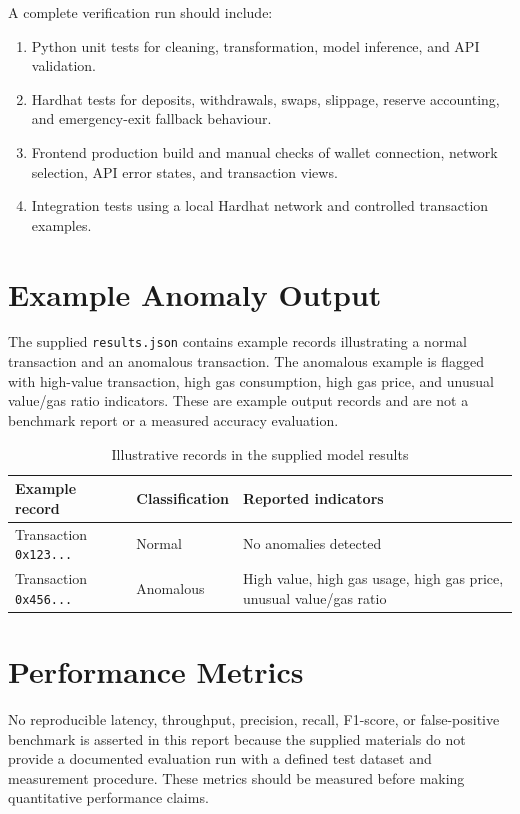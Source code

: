 \documentclass{tietreport}
\begin{document}
A complete verification run should include:
\begin{enumerate}
  \item Python unit tests for cleaning, transformation, model inference, and
  API validation.
  \item Hardhat tests for deposits, withdrawals, swaps, slippage, reserve
  accounting, and emergency-exit fallback behaviour.
  \item Frontend production build and manual checks of wallet connection,
  network selection, API error states, and transaction views.
  \item Integration tests using a local Hardhat network and controlled
  transaction examples.
\end{enumerate}

\section{Example Anomaly Output}
The supplied \texttt{results.json} contains example records illustrating a
normal transaction and an anomalous transaction. The anomalous example is
flagged with high-value transaction, high gas consumption, high gas price,
and unusual value/gas ratio indicators. These are example output records and
are not a benchmark report or a measured accuracy evaluation.

\begin{table}[H]
\centering
\begin{tabularx}{\textwidth}{p{}XX}
\toprule
Example record & Classification & Reported indicators\\
\midrule
Transaction \texttt{0x123...} & Normal & No anomalies detected\\
Transaction \texttt{0x456...} & Anomalous & High value, high gas usage,
high gas price, unusual value/gas ratio\\
\bottomrule
\end{tabularx}
\caption{Illustrative records in the supplied model results}
\label{tab:examples}
\end{table}

\section{Performance Metrics}
No reproducible latency, throughput, precision, recall, F1-score, or
false-positive benchmark is asserted in this report because the supplied
materials do not provide a documented evaluation run with a defined test
dataset and measurement procedure. These metrics should be measured before
making quantitative performance claims.
\end{document}
